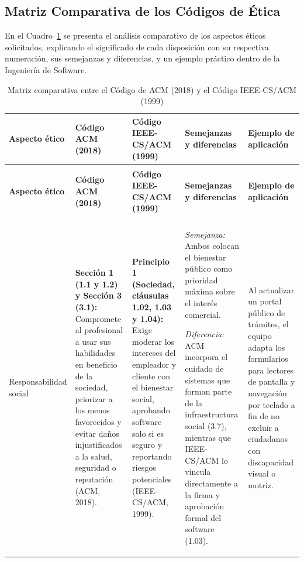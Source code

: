 \documentclass[12pt,a4paper,oneside]{article}
\begin{document}
\subsection{Matriz Comparativa de los Códigos de Ética}
En el Cuadro~\ref{tab:matriz} se presenta el análisis comparativo de los aspectos éticos solicitados, explicando el significado de cada disposición con su respectiva numeración, sus semejanzas y diferencias, y un ejemplo práctico dentro de la Ingeniería de Software.

\begingroup
\small
\setlength{\LTleft}{0pt}
\setlength{\LTright}{0pt}
\renewcommand{\arraystretch}{1.35}
\begin{longtable}{@{}>{\bfseries\raggedright\arraybackslash}p{2.4cm} >{\raggedright\arraybackslash}p{2.9cm} >{\raggedright\arraybackslash}p{2.9cm} >{\raggedright\arraybackslash}p{3.2cm} >{\raggedright\arraybackslash}p{3.3cm}@{}}
\caption{Matriz comparativa entre el Código de ACM (2018) y el Código IEEE-CS/ACM (1999)}\label{tab:matriz}\\
\toprule
\textbf{Aspecto ético} & \textbf{Código ACM (2018)} & \textbf{Código IEEE-CS/ACM (1999)} & \textbf{Semejanzas y diferencias} & \textbf{Ejemplo de aplicación} \\
\midrule
\endfirsthead
\multicolumn{5}{c}{{\tablename\ \thetable{} -- Continuación de la página anterior}} \\
\toprule
\textbf{Aspecto ético} & \textbf{Código ACM (2018)} & \textbf{Código IEEE-CS/ACM (1999)} & \textbf{Semejanzas y diferencias} & \textbf{Ejemplo de aplicación} \\
\midrule
\endhead
\midrule \multicolumn{5}{r}{{Continúa en la siguiente página...}} \\ \bottomrule
\endfoot
\bottomrule
\endlastfoot

Responsabilidad social & 
\textbf{Sección 1 (1.1 y 1.2) y Sección 3 (3.1):} Compromete al profesional a usar sus habilidades en beneficio de la sociedad, priorizar a los menos favorecidos y evitar daños injustificados a la salud, seguridad o reputación (ACM, 2018). & 
\textbf{Principio 1 (Sociedad, cláusulas 1.02, 1.03 y 1.04):} Exige moderar los intereses del empleador y cliente con el bienestar social, aprobando software solo si es seguro y reportando riesgos potenciales (IEEE-CS/ACM, 1999). & 
\textit{Semejanza:} Ambos colocan el bienestar público como prioridad máxima sobre el interés comercial.\par
\textit{Diferencia:} ACM incorpora el cuidado de sistemas que forman parte de la infraestructura social (3.7), mientras que IEEE-CS/ACM lo vincula directamente a la firma y aprobación formal del software (1.03). & 
Al actualizar un portal público de trámites, el equipo adapta los formularios para lectores de pantalla y navegación por teclado a fin de no excluir a ciudadanos con discapacidad visual o motriz. \\
\midrule


\end{longtable}
\end{document}
